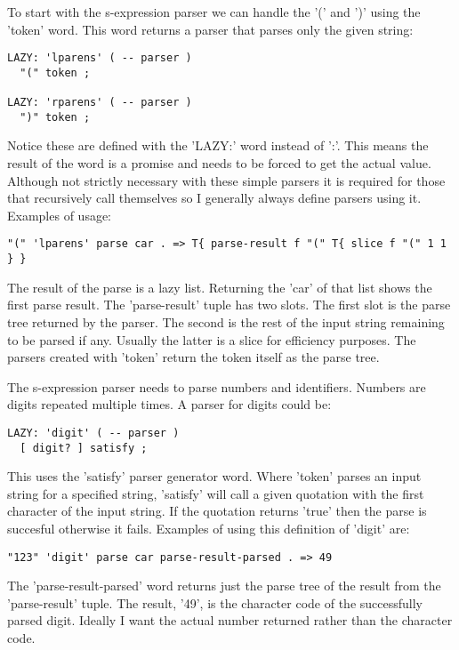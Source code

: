 To start with the s-expression parser we can handle the '(' and ')'
 using the 'token' word. This word returns a parser that parses only
 the given string:

\begin{verbatim}
LAZY: 'lparens' ( -- parser )
  "(" token ;

LAZY: 'rparens' ( -- parser )
  ")" token ;
\end{verbatim}

Notice these are defined with the 'LAZY:' word instead of ':'. This
means the result of the word is a promise and needs to be forced to
get the actual value. Although not strictly necessary with these
simple parsers it is required for those that recursively call
themselves so I generally always define parsers using it. Examples of
usage:

\begin{verbatim}
"(" 'lparens' parse car . => T{ parse-result f "(" T{ slice f "(" 1 1 } }
\end{verbatim}

The result of the parse is a lazy list. Returning the 'car' of that
list shows the first parse result. The 'parse-result' tuple has two
slots. The first slot is the parse tree returned by the parser. The
second is the rest of the input string remaining to be parsed if
any. Usually the latter is a slice for efficiency purposes. The
parsers created with 'token' return the token itself as the parse
tree.

The s-expression parser needs to parse numbers and
identifiers. Numbers are digits repeated multiple times. A parser for
digits could be:

\begin{verbatim}
LAZY: 'digit' ( -- parser )
  [ digit? ] satisfy ;
\end{verbatim}

This uses the 'satisfy' parser generator word. Where 'token' parses an
input string for a specified string, 'satisfy' will call a given
quotation with the first character of the input string. If the
quotation returns 'true' then the parse is succesful otherwise it
fails. Examples of using this definition of 'digit' are:

\begin{verbatim}
"123" 'digit' parse car parse-result-parsed . => 49
\end{verbatim}

The 'parse-result-parsed' word returns just the parse tree of the
result from the 'parse-result' tuple. The result, '49', is the
character code of the successfully parsed digit. Ideally I want the
actual number returned rather than the character code.

